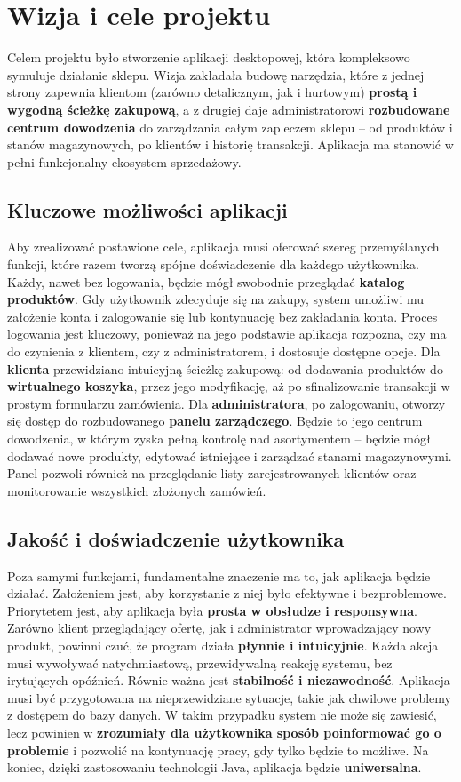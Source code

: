 \chapter{Wizja i cele projektu}
\label{chap:wizja}
Celem projektu było stworzenie aplikacji desktopowej, która kompleksowo symuluje działanie sklepu. Wizja zakładała budowę narzędzia, które z jednej strony zapewnia klientom (zarówno detalicznym, jak i hurtowym) \textbf{prostą i wygodną ścieżkę zakupową}, a z drugiej daje administratorowi \textbf{rozbudowane centrum dowodzenia} do zarządzania całym zapleczem sklepu – od produktów i stanów magazynowych, po klientów i historię transakcji. Aplikacja ma stanowić w pełni funkcjonalny ekosystem sprzedażowy.

\section{Kluczowe możliwości aplikacji}
Aby zrealizować postawione cele, aplikacja musi oferować szereg przemyślanych funkcji, które razem tworzą spójne doświadczenie dla każdego użytkownika.
Każdy, nawet bez logowania, będzie mógł swobodnie przeglądać \textbf{katalog produktów}. Gdy użytkownik zdecyduje się na zakupy, system umożliwi mu założenie konta i zalogowanie się lub kontynuację bez zakładania konta. Proces logowania jest kluczowy, ponieważ na jego podstawie aplikacja rozpozna, czy ma do czynienia z klientem, czy z administratorem, i dostosuje dostępne opcje.
Dla \textbf{klienta} przewidziano intuicyjną ścieżkę zakupową: od dodawania produktów do \textbf{wirtualnego koszyka}, przez jego modyfikację, aż po sfinalizowanie transakcji w prostym formularzu zamówienia.
Dla \textbf{administratora}, po zalogowaniu, otworzy się dostęp do rozbudowanego \textbf{panelu zarządczego}. Będzie to jego centrum dowodzenia, w którym zyska pełną kontrolę nad asortymentem – będzie mógł dodawać nowe produkty, edytować istniejące i zarządzać stanami magazynowymi. Panel pozwoli również na przeglądanie listy zarejestrowanych klientów oraz monitorowanie wszystkich złożonych zamówień.

\section{Jakość i doświadczenie użytkownika}
Poza samymi funkcjami, fundamentalne znaczenie ma to, jak aplikacja będzie działać. Założeniem jest, aby korzystanie z niej było efektywne i bezproblemowe.
Priorytetem jest, aby aplikacja była \textbf{prosta w obsłudze i responsywna}. Zarówno klient przeglądający ofertę, jak i administrator wprowadzający nowy produkt, powinni czuć, że program działa \textbf{płynnie i intuicyjnie}. Każda akcja musi wywoływać natychmiastową, przewidywalną reakcję systemu, bez irytujących opóźnień.
Równie ważna jest \textbf{stabilność i niezawodność}. Aplikacja musi być przygotowana na nieprzewidziane sytuacje, takie jak chwilowe problemy z dostępem do bazy danych. W takim przypadku system nie może się zawiesić, lecz powinien w \textbf{zrozumiały dla użytkownika sposób poinformować go o problemie} i pozwolić na kontynuację pracy, gdy tylko będzie to możliwe.
Na koniec, dzięki zastosowaniu technologii Java, aplikacja będzie \textbf{uniwersalna}.